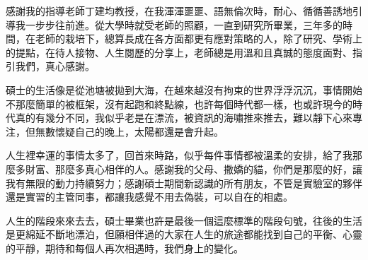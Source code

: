 
\begin{acknowledgement}

感謝我的指導老師丁建均教授，在我渾渾噩噩、語無倫次時，耐心、循循善誘地引導我一步步往前進。從大學時就受老師的照顧，一直到研究所畢業，三年多的時間，在老師的栽培下，總算長成在各方面都更有應對策略的人，除了研究、學術上的提點，在待人接物、人生閱歷的分享上，老師總是用溫和且真誠的態度面對、指引我們，真心感謝。

碩士的生活像是從池塘被拋到大海，在越來越沒有拘束的世界浮浮沉沉，事情開始不那麼簡單的被框架，沒有起跑和終點線，也許每個時代都一樣，也或許現今的時代真的有幾分不同，我似乎老是在漂流，被資訊的海嘯推來推去，難以靜下心來專注，但無數懷疑自己的晚上，太陽都還是會升起。

人生裡幸運的事情太多了，回首來時路，似乎每件事情都被溫柔的安排，給了我那麼多財富、那麼多真心相伴的人。感謝我的父母、撒嬌的貓，你們是那麼的好，讓我有無限的動力持續努力；感謝碩士期間新認識的所有朋友，不管是實驗室的夥伴還是實習的主管同事，都讓我感覺不用去偽裝，可以自在的相處。

人生的階段來來去去，碩士畢業也許是最後一個這麼標準的階段句號，往後的生活是更綿延不斷地漂泊，但願相伴過的大家在人生的旅途都能找到自己的平衡、心靈的平靜，期待和每個人再次相遇時，我們身上的變化。

\end{acknowledgement}